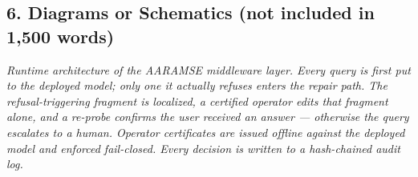 
\subsection*{6. Diagrams or Schematics (not included in 1,500 words)}

\noindent \textit{Runtime architecture of the AARAMSE middleware layer. Every
query is first put to the deployed model; only one it actually refuses enters
the repair path. The refusal-triggering fragment is localized, a certified
operator edits that fragment alone, and a re-probe confirms the user received an
answer --- otherwise the query escalates to a human. Operator certificates are
issued offline against the deployed model and enforced fail-closed. Every
decision is written to a hash-chained audit log.}

\vspace{1em}

